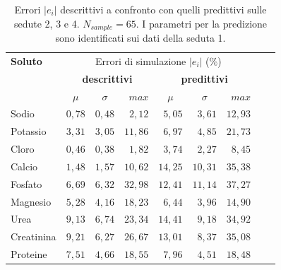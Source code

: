 \begin{table}[htb]
	\centering
	\caption{Errori $|e_i|$ descrittivi a confronto con quelli predittivi sulle sedute 2, 3 e 4. $N_{sample}=65$. I parametri per la predizione sono identificati sui dati della seduta 1.}\label{tab:pred1}
	\begin{tabular}{lrrrrrrrr}
	\toprule 
		\textbf{Soluto}   &    \multicolumn{6}{c}{Errori di simulazione $|e_i|$ ($\%$)}    \\
				              &        \multicolumn{3}{c}{\textbf{descrittivi}}             &       \multicolumn{3}{c}{\textbf{predittivi}}             \\
		                  & \multicolumn{1}{c}{$\mu$}      & \multicolumn{1}{c}{$\sigma$}     & $max$   & \multicolumn{1}{c}{$\mu$}     & \multicolumn{1}{c}{$\sigma$}    & $max$  \\
    \cmidrule(lr){2-4}\cmidrule(lr){5-7}
  	Sodio             & $0,78$   & $0,48$   & $ 2,12$  & $5,05$   & $3,61$    & $12,93$  \\ 
  	Potassio          & $3,31$   & $3,05$   & $11,86$  & $6,97$   & $4,85$    & $21,73$  \\
  	Cloro             & $0,46$   & $0,38$   & $ 1,82$  & $3,74$   & $2,27$    & $ 8,45$  \\
  	Calcio            & $1,48$   & $1,57$   & $10,62$  & $14,25$  & $10,31$   & $35,38$  \\
  	Fosfato           & $6,69$   & $6,32$   & $32,98$  & $12,41$  & $11,14$   & $37,27$  \\ 
  	Magnesio          & $5,28$   & $4,16$   & $18,23$  & $6,44$   & $3,96$    & $14,90$  \\
  	Urea              & $9,13$   & $6,74$   & $23,34$  & $14,41$  & $9,18$    & $34,92$  \\
  	Creatinina        & $9,21$   & $6,27$   & $26,67$  & $13,01$  & $8,37$    & $35,08$  \\
  	Proteine          & $7,51$   & $4,66$   & $18,55$  & $7,96$   & $4,51$    & $18,48$  \\ 
   	\bottomrule
\end{tabular}
\end{table}	

